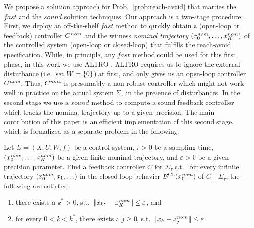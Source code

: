 We propose a solution approach for Prob.~\ref{prob:reach-avoid} that marries the $\mathit{fast}$ and the $\mathit{sound}$ solution techniques.
Our approach is a two-stage procedure: 
First, we deploy an off-the-shelf $\mathit{fast}$ method to quickly obtain a (open-loop or feedback) controller $C^{\mathit{nom}}$ and the witness \emph{nominal trajectory} $(x_0^{\mathit{nom}},\ldots,x_K^{\mathit{nom}})$ of the controlled system (open-loop or closed-loop) that fulfills the reach-avoid specification.
While, in principle, any $\mathit{fast}$ method could be used for this first phase, in this work we use ALTRO \cite{howell2019altro}.
ALTRO requires us to ignore the external disturbance (i.e.\ set $W=\{ 0 \}$) at first, and only gives us an open-loop controller $C^{\mathit{nom}}$.
Thus, $C^{\mathit{nom}}$ is presumably a non-robust controller which might not work well in practice on the actual system $\Sigma_\tau$ in the presence of disturbances.
In the second stage we use a $\mathit{sound}$ method to compute a sound feedback controller which tracks the nominal trajectory up to a given precision.
The main contribution of this paper is an efficient implementation of this second stage, which is formalized as a separate problem in the following:

\begin{problem}\label{prob:tracking}
	Let $\Sigma=(X,U,W,f)$ be a control system, $\tau>0$ be a sampling time, $(x_0^{\mathit{nom}},\ldots,x_K^{\mathit{nom}})$ be a given finite nominal trajectory, and $\varepsilon>0$ be a given precision parameter.
	Find a feedback controller $C$ for $\Sigma_\tau$ s.t.\ 
	for every infinite trajectory $(x_0^{\mathit{nom}},x_1,\ldots)$ in the closed-loop behavior $\mathcal{B}^{\mathrm{CL}}(x_0^{\mathit{nom}})$ of $C \parallel \Sigma_\tau$, the following are satisfied:
	\begin{enumerate}
		\item there exists a $k^\ast>0$, s.t.\ $\| x_{k^\ast}-x_K^{\mathit{nom}} \|\leq \varepsilon$, and
		\item for every $0<k < k^\ast$, there exists a $j\geq0$, s.t.\ $\| x_k-x_j^{\mathit{nom}} \| \leq \varepsilon$.
	\end{enumerate} 
\end{problem}


